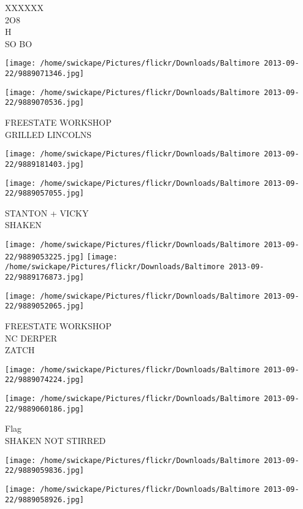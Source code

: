 \documentclass[10pt,letterpaper]{article}
\begin{document}
XXXXXX\\
2O8\\
H\\
SO BO
\pagebreak

\texttt{[image: /home/swickape/Pictures/flickr/Downloads/Baltimore 2013-09-22/9889071346.jpg]}

\vspace{0.25in}
\texttt{[image: /home/swickape/Pictures/flickr/Downloads/Baltimore 2013-09-22/9889070536.jpg]}

FREESTATE WORKSHOP\\
GRILLED LINCOLNS
\pagebreak

\texttt{[image: /home/swickape/Pictures/flickr/Downloads/Baltimore 2013-09-22/9889181403.jpg]}

\vspace{0.25in}
\texttt{[image: /home/swickape/Pictures/flickr/Downloads/Baltimore 2013-09-22/9889057055.jpg]}

STANTON + VICKY\\
SHAKEN
\pagebreak

\texttt{[image: /home/swickape/Pictures/flickr/Downloads/Baltimore 2013-09-22/9889053225.jpg]}
\texttt{[image: /home/swickape/Pictures/flickr/Downloads/Baltimore 2013-09-22/9889176873.jpg]}

\texttt{[image: /home/swickape/Pictures/flickr/Downloads/Baltimore 2013-09-22/9889052065.jpg]}

FREESTATE WORKSHOP\\
NC DERPER\\
ZATCH
\pagebreak

\texttt{[image: /home/swickape/Pictures/flickr/Downloads/Baltimore 2013-09-22/9889074224.jpg]}

\vspace{0.25in}
\texttt{[image: /home/swickape/Pictures/flickr/Downloads/Baltimore 2013-09-22/9889060186.jpg]}

Flag\\
SHAKEN NOT STIRRED
\pagebreak

\texttt{[image: /home/swickape/Pictures/flickr/Downloads/Baltimore 2013-09-22/9889059836.jpg]}

\vspace{0.25in}
\texttt{[image: /home/swickape/Pictures/flickr/Downloads/Baltimore 2013-09-22/9889058926.jpg]}
\end{document}
